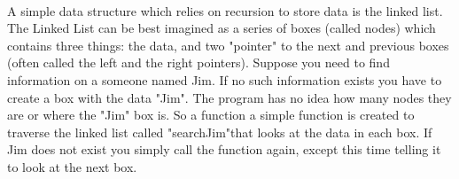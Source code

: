 \documentclass{article}
\begin{document}
~\\A simple data structure which relies on recursion to store data is the linked list.  The Linked List can be best imagined as a series of boxes (called nodes) which contains three things: the data, and two "pointer" to the next and previous boxes (often called the left and the right pointers). Suppose you need to find information on a someone named Jim. If no such information exists you have to create a box with the data "Jim". The program has no idea how many nodes they are or where the "Jim" box is. So a function a simple function is created to traverse the linked list called "searchJim"that looks at the data in each box.  If Jim does not exist you simply call the function again, except this time telling it to look at the next box.             	
\end{document}
